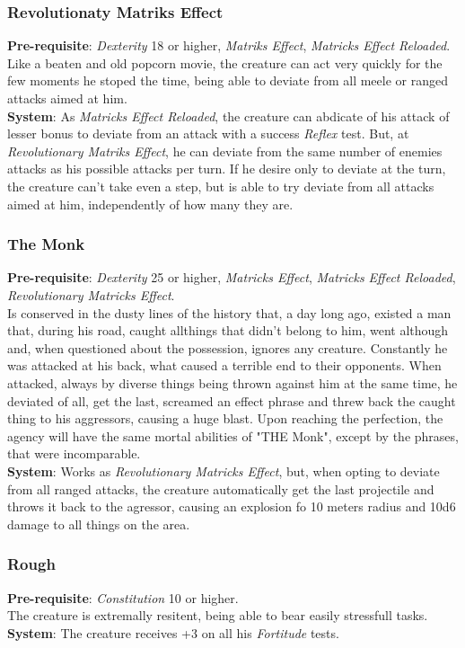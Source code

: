 \documentclass[ letterpaper,12pt]{article}
\begin{document}
\subsubsection{Revolutionaty Matriks Effect}
{\bf Pre-requisite}: {\it Dexterity} 18 or higher, {\it Matriks Effect}, {\it Matricks Effect Reloaded}.\\
Like a beaten and old popcorn movie, the creature can act very quickly for the few moments he stoped the time, being able to deviate from all meele or ranged attacks aimed at him.\\
{\bf System}: As {\it Matricks Effect Reloaded}, the creature can abdicate of his attack of lesser bonus to deviate from an attack with a success {\it Reflex} test. But, at {\it Revolutionary Matriks Effect}, he can deviate from the same number of enemies attacks as his possible attacks per turn. If he desire only to deviate at the turn, the creature can't take even a step, but is able to try deviate from all attacks aimed at him, independently of how many they are.

\subsubsection{The Monk}
{\bf Pre-requisite}: {\it Dexterity} 25 or higher, {\it Matricks Effect}, {\it Matricks Effect Reloaded}, {\it Revolutionary Matricks Effect}.\\
Is conserved in the dusty lines of the history that, a day long ago, existed a man that, during his road, caught allthings that didn't belong to him, went although and, when questioned about the possession, ignores any creature. Constantly he was attacked at his back, what caused a terrible end to their opponents. When attacked, always by diverse things being thrown against him at the same time, he deviated of all, get the last, screamed an effect phrase and threw back the caught thing to his aggressors, causing a huge blast.  Upon reaching the perfection, the agency will have the same mortal abilities of "THE Monk", except by the phrases, that were incomparable.\\
{\bf System}: Works as {\it Revolutionary Matricks Effect}, but, when opting to deviate from all ranged attacks, the creature automatically get the last projectile and throws it back to the agressor, causing an explosion fo 10 meters radius and 10d6 damage to all things on the area.

\subsubsection{Rough}
{\bf Pre-requisite}: {\it Constitution} 10 or higher.\\
The creature is extremally resitent, being able to bear easily stressfull tasks.\\
{\bf System}: The creature receives +3 on all his {\it Fortitude} tests.
\end{document}
